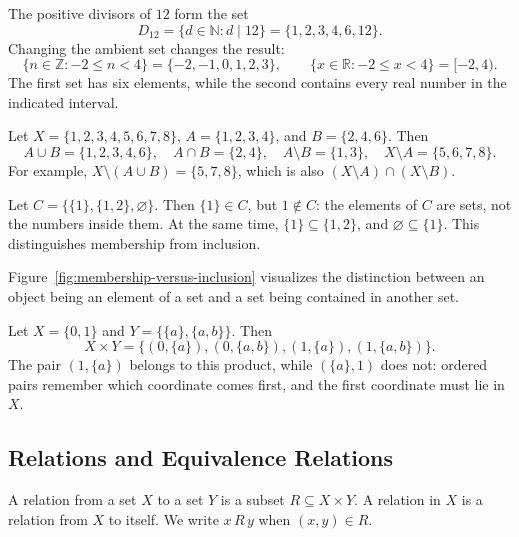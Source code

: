 \begin{example}
The positive divisors of $12$ form the set
\[
  D_{12}=\{d\in\mathbb{N}:d\mid12\}=\{1,2,3,4,6,12\}.
\]
Changing the ambient set changes the result:
\[
  \{n\in\mathbb{Z}:-2\le n<4\}=\{-2,-1,0,1,2,3\},\qquad
  \{x\in\mathbb{R}:-2\le x<4\}=[-2,4).
\]
The first set has six elements, while the second contains every real number in the indicated interval.
\end{example}

\begin{example}
Let $X=\{1,2,3,4,5,6,7,8\}$, $A=\{1,2,3,4\}$, and $B=\{2,4,6\}$. Then
\[
  A\cup B=\{1,2,3,4,6\},\quad
  A\cap B=\{2,4\},\quad
  A\setminus B=\{1,3\},\quad
  X\setminus A=\{5,6,7,8\}.
\]
For example, $X\setminus(A\cup B)=\{5,7,8\}$, which is also $(X\setminus A)\cap(X\setminus B)$.
\end{example}

\begin{example}
Let $C=\{\{1\},\{1,2\},\varnothing\}$. Then $\{1\}\in C$, but $1\notin C$: the elements of $C$ are sets, not the numbers inside them. At the same time, $\{1\}\subseteq\{1,2\}$, and $\varnothing\subseteq\{1\}$. This distinguishes membership from inclusion.
\end{example}

Figure~\ref{fig:membership-versus-inclusion} visualizes the distinction between an object being an element of a set and a set being contained in another set.


\begin{example}
Let $X=\{0,1\}$ and $Y=\{\{a\},\{a,b\}\}$. Then
\[
  X\times Y=\{(0,\{a\}),(0,\{a,b\}),(1,\{a\}),(1,\{a,b\})\}.
\]
The pair $(1,\{a\})$ belongs to this product, while $(\{a\},1)$ does not: ordered pairs remember which coordinate comes first, and the first coordinate must lie in $X$.
\end{example}

\subsection{Relations and Equivalence Relations}

\begin{definition}[Relation]
A relation from a set $X$ to a set $Y$ is a subset $R\subseteq X\times Y$. A relation in $X$ is a relation from $X$ to itself. We write $x\,R\,y$ when $(x,y)\in R$.
\end{definition}

